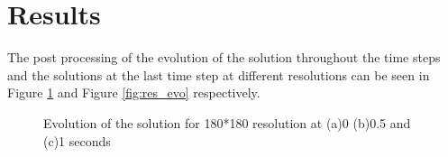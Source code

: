 \documentclass{report}
\begin{document}
\section{Results}
The post processing of the evolution of the solution throughout the time steps and the solutions at the last time step at different resolutions can be seen in Figure \ref{fig:180_evo} and Figure \ref{fig:res_evo} respectively.
\begin{figure}[h]
\begin{center}
\caption{Evolution of the solution for 180*180 resolution at (a)0 (b)0.5 and (c)1 seconds}
\label{fig:180_evo}
\end{center}
\end{figure}
\end{document}
